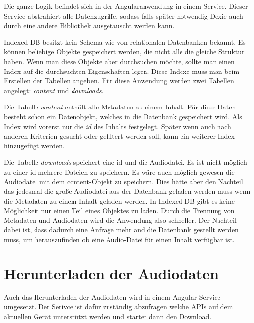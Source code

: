 Die ganze Logik befindet sich in der Angularanwendung in einem Service. Dieser Service abstrahiert alle Datenzugriffe, sodass falls später notwendig Dexie auch durch eine andere Bibliothek ausgetauscht werden kann. 

Indexed DB besitzt kein Schema wie von relationalen Datenbanken bekannt. Es können beliebige Objekte gespeichert werden, die nicht alle die gleiche Struktur haben. Wenn man diese Objekte aber durchsuchen möchte, sollte man einen Index auf die durchsuchten Eigenschaften legen. Diese Indexe muss man beim Erstellen der Tabellen angeben. Für diese Anwendung werden zwei Tabellen angelegt: \emph{content} und \emph{downloads}. 

Die Tabelle \emph{content} enthält alle Metadaten zu einem Inhalt. Für diese Daten besteht schon ein Datenobjekt, welches in die Datenbank gespeichert wird. Als Index wird vorerst nur die \emph{id} des Inhalts festgelegt. Später wenn auch nach anderen Kriterien gesucht oder gefiltert werden soll, kann ein weiterer Index hinzugefügt werden. 

Die Tabelle \emph{downloads} speichert eine id und die Audiodatei. Es ist nicht möglich zu einer id mehrere Dateien zu speichern. Es wäre auch möglich gewesen die Audiodatei mit dem content-Objekt zu speichern. Dies hätte aber den Nachteil das jedesmal die große Audiodatei aus der Datenbank geladen werden muss wenn die Metadaten zu einem Inhalt geladen werden. In Indexed DB gibt es keine Möglichkeit nur einen Teil eines Objektes zu laden. Durch die Trennung von Metadaten und Audiodaten wird die Anwendung also schneller. Der Nachteil dabei ist, dass dadurch eine Anfrage mehr and die Datenbank gestellt werden muss, um herauszufinden ob eine Audio-Datei für einen Inhalt verfügbar ist.

\section{Herunterladen der Audiodaten}
Auch das Herunterladen der Audiodaten wird in einem Angular-Service umgesetzt. Der Serivce ist dafür zuständig abzufragen welche APIs auf dem aktuellen Gerät unterstützt werden und startet dann den Download. 
